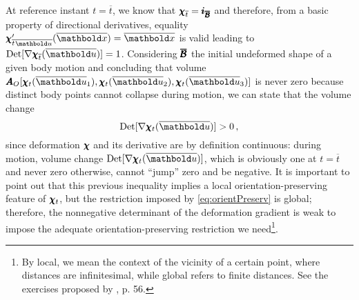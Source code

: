 At reference instant $t=\overline{t}$, we know that $\pmb{\chi}_{\overline{t}}=\pmb{i}_{\pmb{\overline{\mathcal{B}}}}$ and therefore, from a basic property of directional derivatives, equality $\fua{ {\tnr{\chi}'_{\overline{t}} }_{\overline{\vto{u}}} }{ \overline{\vto{x}} }=\overline{\vto{x}}$ is valid leading to $\textnormal{Det}[\fua{\nabla\tnr{\chi}_{\overline{t}}}{\overline{\vto{u}}}]=1$. Considering $\pmb{\overline{\mathcal{B}}}$ the initial undeformed shape of a given body motion and concluding that volume ${\tnr{A}_O}[\fua{\tnr{\chi}_t}{\overline{\vto{u}}_1},\fua{\tnr{\chi}_t}{\overline{\vto{u}}_2},\fua{\tnr{\chi}_t}{\overline{\vto{u}}_3}]$ is never zero because distinct body points cannot collapse during motion, we can state that the volume change       
\begin{equation}\label{eq:detPositive}
\textnormal{Det}[\fua{\nabla\tnr{\chi}_t}{\overline{\vto{u}}}]>0\,,
\end{equation}
since deformation $\pmb{\chi}$ and its derivative are by definition continuous: during motion, volume change $\textnormal{Det}[\fua{\nabla\tnr{\chi}_{t}}{\overline{\vto{u}}}]$, which is obviously one at $t=\overline{t}$ and never zero otherwise, cannot ``jump'' zero and be negative. It is important to point out that this previous inequality implies a local orientation-preserving feature of $\pmb{\chi}_{t}$, but the restriction imposed by \eqref{eq:orientPreserv} is global; therefore, the nonnegative determinant of the deformation gradient is weak to impose the adequate orientation-preserving restriction we need\footnote{By local, we mean the context of the vicinity of a certain point, where distances are infinitesimal, while global refers to finite distances. See the exercises proposed by \cite{drozdov_1996_1}, p. 56.}.  






 

